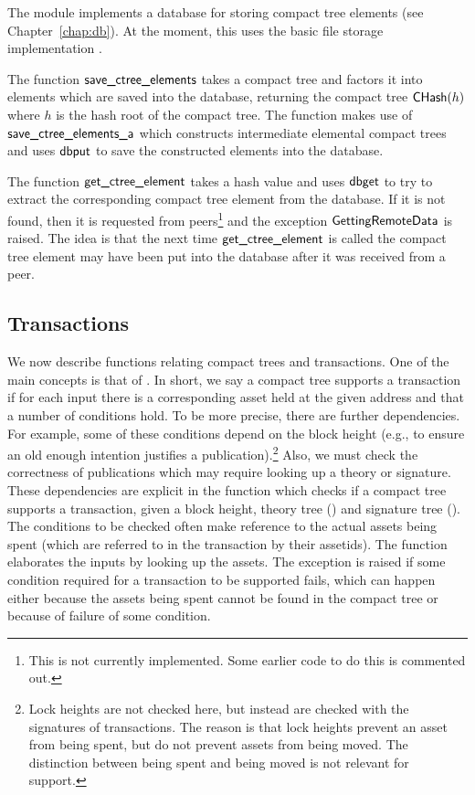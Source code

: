 The module {} implements a database for storing compact tree elements
(see Chapter~\ref{chap:db}).
At the moment, this uses the basic file storage implementation {}.

The function ${\func{save\_ctree\_elements}}$
takes a compact tree and factors it into elements which are saved into
the database, returning the compact tree ${\constr{CHash}}(h)$ where $h$ is the hash root
of the compact tree.
The function makes use of ${\func{save\_ctree\_elements\_a}}$ 
which constructs intermediate elemental compact trees
and uses ${\func{dbput}}$ to save the constructed elements into the database.

The function ${\constr{get\_ctree\_element}}$ takes a hash value and
uses ${\func{dbget}}$ to try to extract the corresponding compact tree element
from the database.
If it is not found, then it is requested from peers\footnote{This is not currently implemented. Some earlier code to do this is commented out.}
and the exception ${\exc{GettingRemoteData}}$ is raised.
The idea is that the next time ${\constr{get\_ctree\_element}}$ is
called the compact tree element
may have been put into the database after it was received from a peer.

\subsection{Transactions}

We now describe functions relating compact trees and transactions.
One of the main concepts is that of {}.
In short, we say a compact tree supports a transaction if for each
input there is a corresponding asset held at the given address
and that a number of conditions hold.
To be more precise, there are further dependencies.
For example, some of these conditions depend on the block height
(e.g., to ensure an old enough intention justifies a publication).\footnote{Lock heights are not checked here, but instead are checked with the signatures of transactions. The reason is that lock heights prevent an asset from being spent, but do not prevent assets from being moved. The distinction between being spent and being moved is not relevant for support.}
Also, we must check the correctness of publications
which may require looking up a theory or signature.
These dependencies
are explicit in the function {}
which checks if a compact tree supports a transaction,
given a block height, theory tree ({}) and signature tree ({}).
The conditions to be checked often make reference to the actual assets
being spent (which are referred to in the transaction by their assetids).
The function {} elaborates
the inputs by looking up the assets.
The exception {} is raised if
some condition required for a transaction to be supported fails,
which can happen either because the assets being spent cannot be found
in the compact tree or because of failure of some condition.

